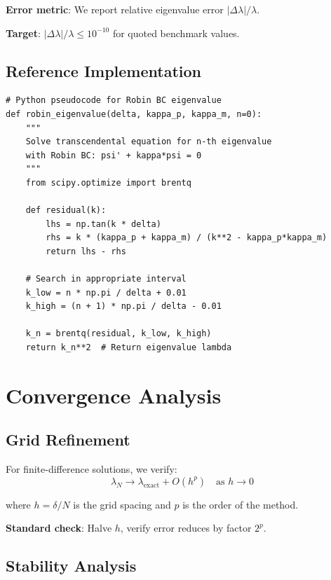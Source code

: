 \textbf{Error metric}: We report relative eigenvalue error $|\Delta\lambda|/\lambda$.

\textbf{Target}: $|\Delta\lambda|/\lambda \le 10^{-10}$ for quoted benchmark values.

\subsection{Reference Implementation}

\begin{verbatim}
# Python pseudocode for Robin BC eigenvalue
def robin_eigenvalue(delta, kappa_p, kappa_m, n=0):
    """
    Solve transcendental equation for n-th eigenvalue
    with Robin BC: psi' + kappa*psi = 0
    """
    from scipy.optimize import brentq

    def residual(k):
        lhs = np.tan(k * delta)
        rhs = k * (kappa_p + kappa_m) / (k**2 - kappa_p*kappa_m)
        return lhs - rhs

    # Search in appropriate interval
    k_low = n * np.pi / delta + 0.01
    k_high = (n + 1) * np.pi / delta - 0.01

    k_n = brentq(residual, k_low, k_high)
    return k_n**2  # Return eigenvalue lambda
\end{verbatim}

\section{Convergence Analysis}
\label{sec:convergence}

\subsection{Grid Refinement}

For finite-difference solutions, we verify:
\begin{equation}
\lambda_N \to \lambda_{\text{exact}} + O(h^p) \quad \text{as } h \to 0
\end{equation}

where $h = \delta/N$ is the grid spacing and $p$ is the order of the method.

\textbf{Standard check}: Halve $h$, verify error reduces by factor $2^p$.

\subsection{Stability Analysis}

